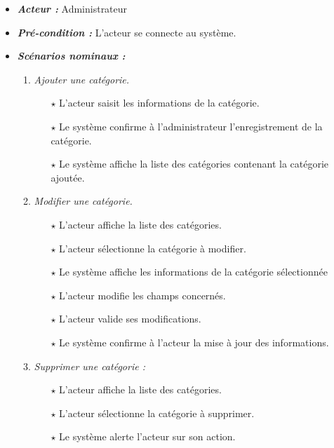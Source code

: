 \begin{itemize}
\begin{itemize}
    \item \textit{\textbf{Acteur :}} Administrateur

    \item \textit{\textbf{Pré-condition  :}} L’acteur se connecte au système. 

    \item \textit{\textbf{Scénarios nominaux :}}
         \begin{enumerate}
             \item \textit{Ajouter une catégorie.}
                    \begin{itemize}
                       \item[$\star$]  L’acteur saisit les informations de la catégorie. 
                       \item[$\star$] Le système confirme à l’administrateur l’enregistrement de la catégorie.
                       \item[$\star$] Le système affiche la liste des catégories contenant la catégorie ajoutée.
                    \end{itemize}
             \item \textit{Modifier une catégorie.}
                    \begin{itemize}
                       \item[$\star$] L’acteur affiche la liste des catégories. 
                       \item[$\star$] L’acteur sélectionne la catégorie à modifier. 
                       \item[$\star$] Le système affiche les informations de la catégorie sélectionnée
                       \item[$\star$] L’acteur modifie les champs concernés. 
                       \item[$\star$] L’acteur valide ses modifications. 
                       \item[$\star$] Le système confirme à l’acteur la mise à jour des informations.
                    \end{itemize}
             \item \textit{Supprimer une catégorie :}
                    \begin{itemize}
                       \item[$\star$] L’acteur affiche la liste des catégories. 
                       \item[$\star$] L’acteur sélectionne la catégorie à supprimer. 
                       \item[$\star$] Le système alerte l’acteur sur son action. 

\end{itemize}
\end{enumerate}
\end{itemize}
\end{itemize}
